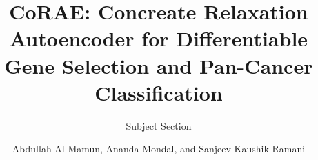 \documentclass{bioinfo}
\begin{document}

\subtitle{Subject Section}

\title[short Title]{
CoRAE: Concreate Relaxation Autoencoder for Differentiable Gene Selection and Pan-Cancer Classification
}
\author[Sample \textit{et~al}.]{Abdullah Al Mamun, Ananda Mondal, and Sanjeev Kaushik Ramani}

\address
{
School of Computing and Information Sciences, Miami, US \\
}



\end{document}
